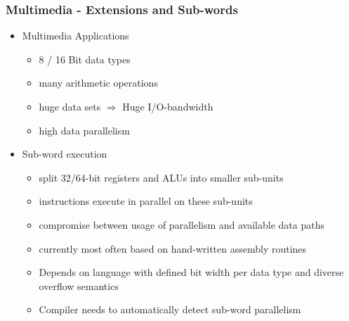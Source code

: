 \subsubsection{Multimedia - Extensions and Sub-words}
\begin{itemize}
	\item Multimedia Applications
		\begin{itemize}
			\item 8 / 16 Bit data types
			\item many arithmetic operations
			\item huge data sets $\Rightarrow$ Huge I/O-bandwidth
			\item high data parallelism 
		\end{itemize}
	\item Sub-word execution
		\begin{itemize}
			\item split 32/64-bit registers and ALUs into smaller sub-units
			\item instructions execute in parallel on these sub-units
			\item compromise between usage of parallelism and available data paths
			\item currently most often based on hand-written assembly routines
			\item Depends on language with defined bit width per data type and diverse overflow semantics
			\item Compiler needs to automatically detect sub-word parallelism 
		\end{itemize}
\end{itemize}

